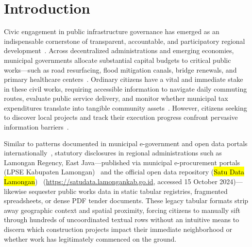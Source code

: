 \documentclass[runningheads]{llncs}
\begin{document}
\section{Introduction}
Civic engagement in public infrastructure governance has emerged as an indispensable cornerstone of transparent, accountable, and participatory regional development~\cite{ansari2022enhancing,chokki2022engaging}. Across decentralized administrations and emerging economies, municipal governments allocate substantial capital budgets to critical public works---such as road resurfacing, flood mitigation canals, bridge renewals, and primary healthcare centers~\cite{matheus2021design}. Ordinary citizens have a vital and immediate stake in these civil works, requiring accessible information to navigate daily commuting routes, evaluate public service delivery, and monitor whether municipal tax expenditures translate into tangible community assets~\cite{nikiforova2021open,zhao2023digital}. However, citizens seeking to discover local projects and track their execution progress confront pervasive information barriers~\cite{ansari2022enhancing,nikiforova2021open}. 

Similar to patterns documented in municipal e-government and open data portals internationally~\cite{matheus2021design,zhao2023digital}, statutory disclosures in regional administrations such as Lamongan Regency, East Java---published via municipal e-procurement portals (LPSE Kabupaten Lamongan)~\cite{jaelani2024pelaksanaan} and the official open data repository (\hl{Satu Data Lamongan})~\cite{satudatalamongan2024} (\url{https://satudata.lamongankab.go.id}, accessed 15 October 2024)---likewise sequester public works data in static tabular registries, fragmented spreadsheets, or dense PDF tender documents. These legacy tabular formats strip away geographic context and spatial proximity, forcing citizens to manually sift through hundreds of uncoordinated textual rows without an intuitive means to discern which construction projects impact their immediate neighborhood or whether work has legitimately commenced on the ground.
\end{document}
